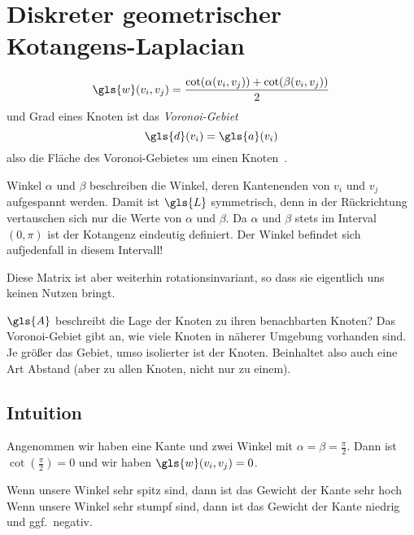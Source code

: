 \section{Diskreter geometrischer Kotangens-Laplacian}

\begin{equation}
  \gls{w}\left(v_i, v_j\right) = \frac{\cot\left(\alpha\left(v_i, v_j\right)\right) + \cot\left(\beta\left(v_i, v_j\right)\right)}{2}
\end{equation}
und Grad eines Knoten ist das \emph{Voronoi-Gebiet}
\begin{equation}
  \gls{d}\left(v_i\right) = \gls{a}\left(v_i\right)
\end{equation}
also die Fläche des Voronoi-Gebietes um einen Knoten~\cite{Reuter}.

Winkel $\alpha$ und $\beta$ beschreiben die Winkel, deren Kantenenden von $v_i$ und $v_j$ aufgespannt werden.
Damit ist $\gls{L}$ symmetrisch, denn in der Rückrichtung vertauschen sich nur die Werte von $\alpha$ und $\beta$.
Da $\alpha$ und $\beta$ stets im Interval $\left(0, \pi\right)$ ist der Kotangenz eindeutig definiert.
Der Winkel befindet sich aufjedenfall in diesem Intervall!

Diese Matrix ist aber weiterhin rotationsinvariant, so dass sie eigentlich uns keinen Nutzen bringt.

$\gls{A}$ beschreibt die Lage der Knoten zu ihren benachbarten Knoten? 
Das Voronoi-Gebiet gibt an, wie viele Knoten in näherer Umgebung vorhanden sind.
Je größer das Gebiet, umso isolierter ist der Knoten.
Beinhaltet also auch eine Art Abstand (aber zu allen Knoten, nicht nur zu einem).

\subsection{Intuition}

\begin{center}
\end{center}

Angenommen wir haben eine Kante und zwei Winkel mit $\alpha = \beta = \frac{\pi}{2}$.
Dann ist $\cot\left(\frac{\pi}{2}\right) = 0$ und wir haben $\gls{w}\left(v_i, v_j\right) = 0$.

Wenn unsere Winkel sehr spitz sind, dann ist das Gewicht der Kante sehr hoch
Wenn unsere Winkel sehr stumpf sind, dann ist das Gewicht der Kante niedrig und ggf.\ negativ.

